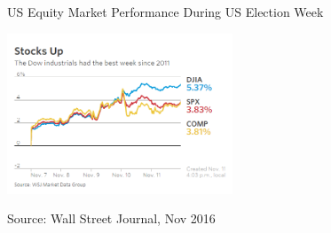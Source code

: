 \documentclass[11pt]{article}
\begin{document}
\begin{figure}[h]
    \centering
 	\caption{US Equity Market Performance During US Election Week}
    \includegraphics[width=0.6\textwidth]{ElectionDay}
    \label{fig:election}
	\caption*{\small Source: Wall Street Journal, Nov 2016}
\end{figure}
\end{document}
